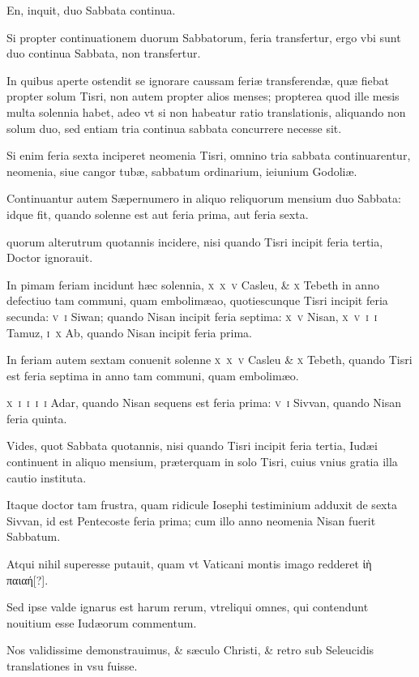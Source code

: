 \begin{parnumbers}
En, inquit, duo Sabbata continua.

Si propter continuationem duorum Sabbatorum, feria transfertur, ergo vbi sunt duo continua Sabbata, non transfertur. 

In quibus aperte ostendit se ignorare caussam feriæ transferendæ, quæ fiebat propter solum Tisri, non autem propter alios menses; propterea quod ille mesis multa solennia habet, adeo vt si non habeatur ratio translationis, aliquando non solum duo, sed entiam tria continua sabbata concurrere necesse sit.

Si enim feria sexta inciperet neomenia Tisri, omnino tria sabbata continuarentur, neomenia,
siue cangor tubæ, sabbatum ordinarium, ieiunium Godoliæ.

Continuantur autem Sæpernumero in aliquo reliquorum mensium duo Sabbata: idque fit, quando solenne est aut feria prima, aut feria sexta.

quorum alterutrum quotannis incidere, nisi quando Tisri incipit feria tertia, Doctor ignorauit.

In pimam feriam incidunt hæc solennia, \textsc{x~x~v} Casleu, \& \textsc{x} Tebeth in anno defectiuo tam communi, quam embolimæao, quotiescunque Tisri incipit feria secunda: \textsc{v~i} Siwan; quando Nisan incipit feria septima: \textsc{x~v} Nisan, \textsc{x~v~i~i} Tamuz, \textsc{i~x} Ab, quando Nisan incipit feria prima.

In feriam autem sextam conuenit solenne \textsc{x~x~v} Casleu \& \textsc{x} Tebeth, quando Tisri est feria septima in anno tam communi, quam embolimæo.

\textsc{x~i~i~i~i} Adar, quando Nisan sequens est feria prima: \textsc{v~i} Sivvan, quando Nisan feria quinta.

Vides, quot Sabbata quotannis, nisi quando Tisri incipit feria tertia, Iudæi continuent in aliquo mensium, præterquam in solo Tisri, cuius vnius gratia illa cautio instituta.

Itaque doctor tam frustra, quam ridicule Iosephi testiminium adduxit de sexta Sivvan, id est Pentecoste feria prima; cum illo anno neomenia Nisan fuerit Sabbatum.

Atqui nihil superesse putauit, quam vt Vaticani montis imago redderet \textgreek{ἰὴ παιαή[?]}.

Sed ipse valde ignarus est harum rerum, vtreliqui omnes, qui contendunt nouitium esse Iudæorum commentum.

Nos validissime demonstrauimus, \& sæculo Christi, \& retro sub Seleucidis translationes in vsu fuisse.


\end{parnumbers}
